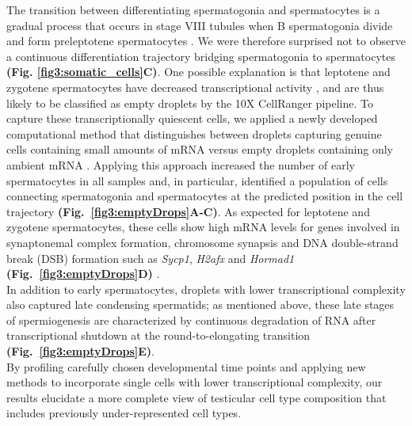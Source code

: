 The transition between differentiating spermatogonia and spermatocytes is a gradual process that occurs in stage VIII tubules when B spermatogonia divide and form preleptotene spermatocytes \citep{Anderson2008, Baltus2006}. We were therefore surprised not to observe a continuous differentiation trajectory bridging spermatogonia to spermatocytes \textbf{(Fig. \ref{fig3:somatic_cells}C)}. One possible explanation is that leptotene and zygotene spermatocytes have decreased transcriptional activity \citep{Kierszenbaum1974, Monesi1965}, and are thus likely to be classified as empty droplets by the 10X CellRanger pipeline. 
To capture these transcriptionally quiescent cells, we applied a newly developed computational method that distinguishes between droplets capturing genuine cells containing small amounts of mRNA versus empty droplets containing only ambient mRNA \citep{Lun2018}. Applying this approach increased the number of early spermatocytes in all samples and, in particular, identified a population of cells connecting spermatogonia and spermatocytes at the predicted position in the cell trajectory \textbf{(Fig.~\ref{fig3:emptyDrops}A-C)}. As expected for leptotene and zygotene spermatocytes, these cells show high mRNA levels for genes involved in synaptonemal complex formation, chromosome synapsis and DNA double-strand break (DSB) formation such as \textit{Sycp1}, \textit{H2afx} and \textit{Hormad1} \textbf{(Fig.~\ref{fig3:emptyDrops}D)} \citep{Daniel2011, Mahadevaiah2001, Vries2005}.\\
In addition to early spermatocytes, droplets with lower transcriptional complexity also captured late condensing spermatids; as mentioned above, these late stages of spermiogenesis are characterized by continuous degradation of RNA after transcriptional shutdown at the round-to-elongating transition \citep{Steger1999} \textbf{(Fig.~\ref{fig3:emptyDrops}E)}.\\
 
By profiling carefully chosen developmental time points and applying new methods to incorporate single cells with lower transcriptional complexity, our results elucidate a more complete view of testicular cell type composition that includes previously under-represented cell types.

\newpage

